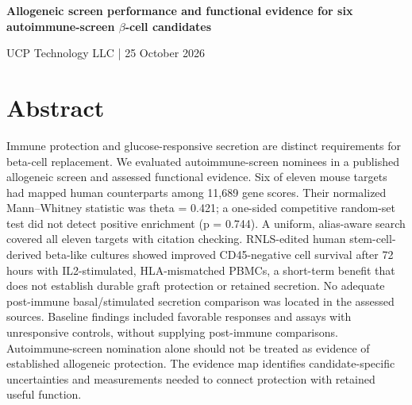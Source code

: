 \documentclass[11pt,letterpaper]{article}
\begin{document}
{\LARGE\bfseries Allogeneic screen performance and functional evidence for six autoimmune-screen \(\beta\)-cell candidates\par}
\vspace{8pt}UCP Technology LLC | 25 October 2026\par
\section*{Abstract}
Immune protection and glucose-responsive secretion are distinct requirements for beta-cell replacement. We evaluated autoimmune-screen nominees in a published allogeneic screen and assessed functional evidence. Six of eleven mouse targets had mapped human counterparts among 11,689 gene scores. Their normalized Mann--Whitney statistic was theta = 0.421; a one-sided competitive random-set test did not detect positive enrichment (p = 0.744). A uniform, alias-aware search covered all eleven targets with citation checking. RNLS-edited human stem-cell-derived beta-like cultures showed improved CD45-negative cell survival after 72 hours with IL2-stimulated, HLA-mismatched PBMCs, a short-term benefit that does not establish durable graft protection or retained secretion. No adequate post-immune basal/stimulated secretion comparison was located in the assessed sources. Baseline findings included favorable responses and assays with unresponsive controls, without supplying post-immune comparisons. Autoimmune-screen nomination alone should not be treated as evidence of established allogeneic protection. The evidence map identifies candidate-specific uncertainties and measurements needed to connect protection with retained useful function.\par
\end{document}
